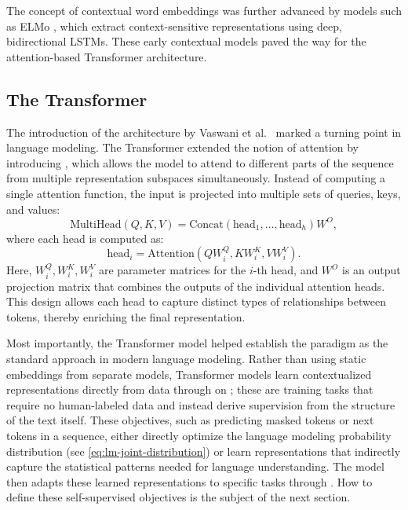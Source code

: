 The concept of contextual word embeddings was further advanced by models such as ELMo \citep{peters2018deep}, which extract context-sensitive representations using deep, bidirectional LSTMs. These early contextual models paved the way for the attention-based Transformer architecture.

\subsection{The Transformer}
The introduction of the  architecture by Vaswani et al.~\citep{vaswani2017attention} marked a turning point in language modeling. The Transformer extended the notion of attention by introducing , which allows the model to attend to different parts of the sequence from multiple representation subspaces simultaneously. Instead of computing a single attention function, the input is projected into multiple sets of queries, keys, and values:
\begin{equation}
\text{MultiHead}(Q, K, V) = \text{Concat}(\text{head}_1, \dots, \text{head}_h)W^O,
\end{equation}
where each head is computed as:
\begin{equation}
\text{head}_i = \text{Attention}(QW_i^Q, KW_i^K, VW_i^V).
\end{equation}
Here, $W_i^Q, W_i^K, W_i^V$ are parameter matrices for the $i$-th head, and $W^O$ is an output projection matrix that combines the outputs of the individual attention heads. This design allows each head to capture distinct types of relationships between tokens, thereby enriching the final representation.

Most importantly, the Transformer model helped establish the  paradigm as the standard approach in modern language modeling. Rather than using static embeddings from separate models, Transformer models learn contextualized representations directly from data through  on ; these are training tasks that require no human-labeled data and instead derive supervision from the structure of the text itself. These objectives, such as predicting masked tokens or next tokens in a sequence, either directly optimize the language modeling probability distribution (see \cref{eq:lm-joint-distribution}) or learn representations that indirectly capture the statistical patterns needed for language understanding. The model then adapts these learned representations to specific tasks through . How to define these self-supervised objectives is the subject of the next section.


